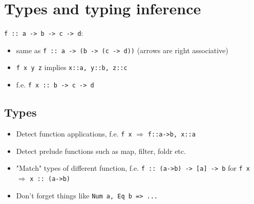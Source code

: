 \documentclass{article}
\begin{document}
\section{Types and typing inference}
\texttt{f :: a -> b -> c -> d}:
\begin{itemize}
    \item same as \texttt{f :: a -> (b -> (c -> d))} (arrows are right associative) 
    \item \texttt{f x y z} implies \texttt{x::a, y::b, z::c} 
    \item f.e. \texttt{f x :: b -> c -> d}
\end{itemize}
\subsection{Types}
\begin{itemize}
    \item Detect function applications, f.e. \texttt{f x} $\Rightarrow$ \texttt{f::a->b, x::a}
    \item Detect prelude functions such as map, filter, foldr etc.
    \item "Match" types of different function, f.e. \texttt{f :: (a->b) -> [a] -> b} for  \texttt{f x} $\Rightarrow$ \texttt{x :: (a->b)}
    \item Don't forget things like \texttt{Num a, Eq b => ...}
\end{itemize}
\end{document}
